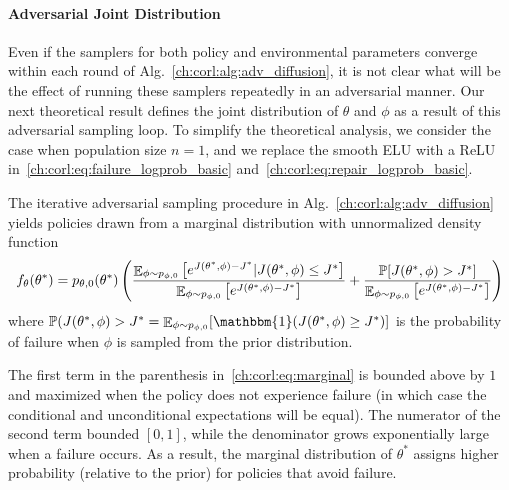 \paragraph{Adversarial Joint Distribution} Even if the samplers for both policy and environmental parameters converge within each round of Alg.~\ref{ch:corl:alg:adv_diffusion}, it is not clear what will be the effect of running these samplers repeatedly in an adversarial manner. Our next theoretical result defines the joint distribution of $\theta$ and $\phi$ as a result of this adversarial sampling loop. To simplify the theoretical analysis, we consider the case when population size $n=1$, and we replace the smooth ELU with a ReLU in~\eqref{ch:corl:eq:failure_logprob_basic} and~\eqref{ch:corl:eq:repair_logprob_basic}.

\begin{theorem}\label{ch:corl:thm:joint}
    The iterative adversarial sampling procedure in Alg.~\ref{ch:corl:alg:adv_diffusion} yields policies drawn from a marginal distribution with unnormalized density function
    \begin{equation}
        f_\theta(\theta^*) = p_{\theta, 0}(\theta^*) \left( \frac{\mathop{\mathbb{E}}_{\phi \sim p_{\phi, 0}}\left[ e^{J(\theta^*, \phi) - J^*} | J(\theta^*, \phi) \leq J^* \right]}{\mathop{\mathbb{E}}_{\phi \sim p_{\phi, 0}}\left[ e^{J(\theta^*, \phi) - J^*} \right]} +
            \frac{\mathbb{P}[J(\theta^*, \phi) > J^*]}{\mathop{\mathbb{E}}_{\phi \sim p_{\phi, 0}}\left[ e^{J(\theta^*, \phi) - J^*}\right]} \right)\label{ch:corl:eq:marginal}
    \end{equation}
    where $\mathbb{P}(J(\theta^*, \phi) > J^* = \expectation_{\phi \sim p_{\phi, 0}}[\mathbbm{1}(J(\theta^*, \phi) \geq J^*)]$ is the probability of failure when $\phi$ is sampled from the prior distribution.
\end{theorem}

The first term in the parenthesis in~\eqref{ch:corl:eq:marginal} is bounded above by $1$ and maximized when the policy does not experience failure (in which case the conditional and unconditional expectations will be equal). The numerator of the second term bounded $[0, 1]$, while the denominator grows exponentially large when a failure occurs. As a result, the marginal distribution of $\theta^*$ assigns higher probability (relative to the prior) for policies that avoid failure.

